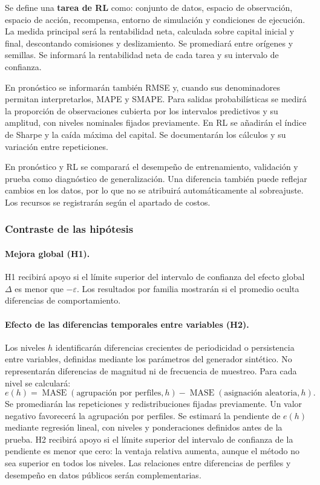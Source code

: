 \documentclass[11pt,letterpaper]{article}
\begin{document}
Se define una \textbf{tarea de RL} como: conjunto de datos, espacio de observación, espacio de acción, recompensa, entorno de simulación y condiciones de ejecución. La medida principal será la rentabilidad neta, calculada sobre capital inicial y final, descontando comisiones y deslizamiento. Se promediará entre orígenes y semillas. Se informará la rentabilidad neta de cada tarea y su intervalo de confianza.

En pronóstico se informarán también RMSE y, cuando sus denominadores permitan interpretarlos, MAPE y SMAPE. Para salidas probabilísticas se medirá la proporción de observaciones cubierta por los intervalos predictivos y su amplitud, con niveles nominales fijados previamente. En RL se añadirán el índice de Sharpe y la caída máxima del capital. Se documentarán los cálculos y su variación entre repeticiones.

En pronóstico y RL se comparará el desempeño de entrenamiento, validación y prueba como diagnóstico de generalización. Una diferencia también puede reflejar cambios en los datos, por lo que no se atribuirá automáticamente al sobreajuste. Los recursos se registrarán según el apartado de costos.

\subsubsection{Contraste de las hipótesis}
\label{sec:hipotesis}

\paragraph{Mejora global (H1).}
H1 recibirá apoyo si el límite superior del intervalo de confianza del efecto global $\Delta$ es menor que $-\varepsilon$. Los resultados por familia mostrarán si el promedio oculta diferencias de comportamiento. 

\paragraph{Efecto de las diferencias temporales entre variables (H2).}
Los niveles $h$ identificarán diferencias crecientes de periodicidad o persistencia entre variables, definidas mediante los parámetros del generador sintético. No representarán diferencias de magnitud ni de frecuencia de muestreo. Para cada nivel se calculará:
\[
e(h)=\operatorname{MASE}(\text{agrupación por perfiles},h)
-\operatorname{MASE}(\text{asignación aleatoria},h).
\]
Se promediarán las repeticiones y redistribuciones fijadas previamente. Un valor negativo favorecerá la agrupación por perfiles. Se estimará la pendiente de $e(h)$ mediante regresión lineal, con niveles y ponderaciones definidos antes de la prueba. H2 recibirá apoyo si el límite superior del intervalo de confianza de la pendiente es menor que cero: la ventaja relativa aumenta, aunque el método no sea superior en todos los niveles. Las relaciones entre diferencias de perfiles y desempeño en datos públicos serán complementarias.
\end{document}
